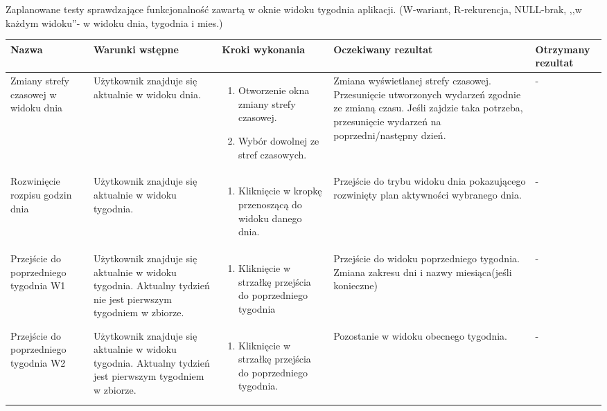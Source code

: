 \documentclass{article}
\begin{document}
Zaplanowane testy sprawdzające funkcjonalność zawartą w oknie widoku tygodnia aplikacji. (W-wariant, R-rekurencja, NULL-brak, ,,w każdym widoku''- w widoku dnia, tygodnia i mies.)
\setlength\LTleft{-1in}

	\begin{longtable}[H]{| m{3.5cm} | m{3.5cm} | m{3.5cm} | m{3.5cm} | m{3.5cm} |} \hline
	Nazwa & Warunki wstępne & Kroki wykonania & Oczekiwany rezultat & Otrzymany rezultat \\ \hline

	Zmiany strefy czasowej w widoku dnia & Użytkownik znajduje się aktualnie w widoku dnia. & \begin{enumerate}[leftmargin =*, topsep=0pt] \item Otworzenie okna zmiany strefy czasowej. \item 
	Wybór dowolnej ze stref czasowych. \end{enumerate} & Zmiana wyświetlanej strefy czasowej. Przesunięcie utworzonych wydarzeń zgodnie ze zmianą czasu. Jeśli zajdzie taka potrzeba, 
	przesunięcie wydarzeń na poprzedni/następny dzień. & - \\ \hline 
	
	 Rozwinięcie rozpisu godzin dnia & Użytkownik znajduje się aktualnie w widoku tygodnia. & \begin{enumerate}[leftmargin =*, topsep=0pt] \item Kliknięcie w kropkę przenoszącą do widoku danego 
	 dnia. \end{enumerate} & Przejście do trybu widoku dnia pokazującego rozwinięty plan aktywności wybranego dnia. & - \\ \hline

	Przejście do poprzedniego tygodnia W1 & Użytkownik znajduje się aktualnie w widoku tygodnia. Aktualny tydzień nie jest pierwszym tygodniem w zbiorze. & \begin{enumerate}[leftmargin =*, 
	topsep=0pt] \item Kliknięcie w strzałkę przejścia do poprzedniego tygodnia \end{enumerate} & Przejście do widoku poprzedniego tygodnia. Zmiana zakresu dni i nazwy miesiąca(jeśli konieczne) & 
	- \\ \hline

	Przejście do poprzedniego tygodnia W2 & Użytkownik znajduje się aktualnie w widoku tygodnia. Aktualny tydzień jest pierwszym tygodniem w zbiorze. & \begin{enumerate}[leftmargin =*, 
	topsep=0pt] \item Kliknięcie w strzałkę przejścia do poprzedniego tygodnia. \end{enumerate} & Pozostanie w widoku obecnego tygodnia. & - \\ \hline
	

\end{longtable}
\end{document}
